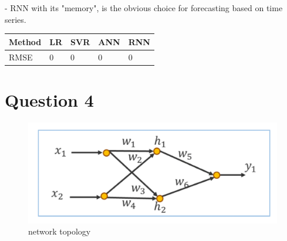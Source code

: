 \documentclass[a4paper, article, oneside, USenglish, IN5460]{memoir}
\begin{document}
- RNN with its "memory", is the obvious choice for forecasting based on time series.

\begin{table}[H]
\begin{tabular}{|l|l|l|l|l|}
\hline
Method & LR & SVR & ANN & RNN \\ \hline
RMSE   & 0  & 0   & 0   & 0   \\ \hline
\end{tabular}
\end{table}


\chapter{Question 4}

\begin{figure}
\centering
\includegraphics[width=0.8\linewidth]{fig/q4.png}
\caption{\label{fig:q4} \neural network topology}
\end{figure}
\end{document}
